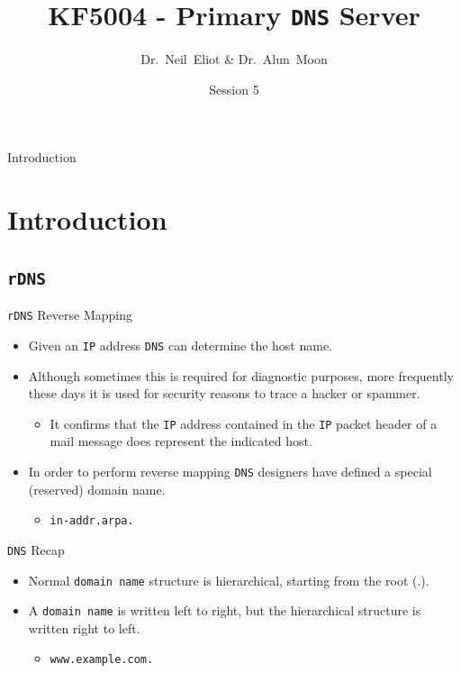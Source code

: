 \documentclass[xcolor=table]{beamer}
\title{KF5004 - Primary \texttt{DNS} Server}
\author{Dr.~Neil~Eliot \& Dr.~Alun~Moon}
\institute[Northumbria University] %
{
  Department of Computer and Information Sciences\\
  University of Northumbria
}
\date{Session 5}
\begin{document}
\begin{frame}
  \titlepage
\end{frame}

\begin{frame}{Introduction}
  \tableofcontents
\end{frame}


\section{Introduction}
\subsection{\texttt{rDNS}}
\begin{frame}{\texttt{rDNS} Reverse Mapping}
  \begin{itemize}
    \item Given an \texttt{IP} address \texttt{DNS} can determine the host name.
    \item Although sometimes this is required for diagnostic purposes, more frequently these days it is used for security reasons to trace a hacker or spammer.
      \begin{itemize}
        \item It confirms that the \texttt{IP} address contained in the \texttt{IP} packet header of a mail message does represent the indicated host.
      \end{itemize}
    \item In order to perform reverse mapping \texttt{DNS} designers have defined a special (reserved) domain name.
    \begin{itemize}
      \item \texttt{in-addr.arpa.}
    \end{itemize}
\end{itemize}
\end{frame}

\begin{frame}{\texttt{DNS} Recap}
  \begin{itemize}
    \item Normal \texttt{domain name} structure is hierarchical, starting from the root (.).
    \item A \texttt{domain name} is written left to right, but the hierarchical structure is written right to left.
      \begin{itemize}
        \item \texttt{www.example.com.}
      \end{itemize}
  \end{itemize}
\end{frame}
\end{document}
